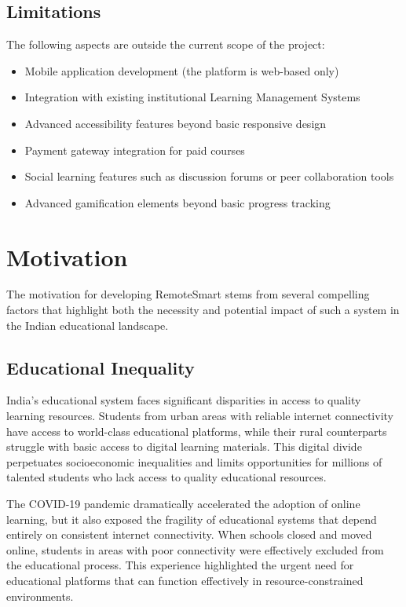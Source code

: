 \documentclass[12pt,a4paper]{report}
\begin{document}
\subsection{Limitations}

The following aspects are outside the current scope of the project:

\begin{itemize}
    \item Mobile application development (the platform is web-based only)
    \item Integration with existing institutional Learning Management Systems
    \item Advanced accessibility features beyond basic responsive design
    \item Payment gateway integration for paid courses
    \item Social learning features such as discussion forums or peer collaboration tools
    \item Advanced gamification elements beyond basic progress tracking
\end{itemize}

\section{Motivation}

The motivation for developing RemoteSmart stems from several compelling factors that highlight both the necessity and potential impact of such a system in the Indian educational landscape.

\subsection{Educational Inequality}

India's educational system faces significant disparities in access to quality learning resources. Students from urban areas with reliable internet connectivity have access to world-class educational platforms, while their rural counterparts struggle with basic access to digital learning materials. This digital divide perpetuates socioeconomic inequalities and limits opportunities for millions of talented students who lack access to quality educational resources.

The COVID-19 pandemic dramatically accelerated the adoption of online learning, but it also exposed the fragility of educational systems that depend entirely on consistent internet connectivity. When schools closed and moved online, students in areas with poor connectivity were effectively excluded from the educational process. This experience highlighted the urgent need for educational platforms that can function effectively in resource-constrained environments.
\end{document}
